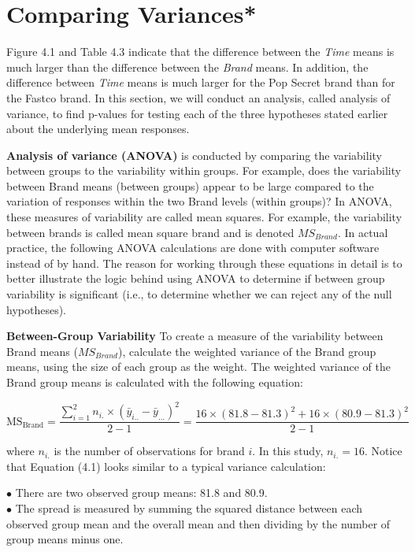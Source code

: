 \documentclass[
]{report}
\theoremstyle{definition}
\theoremstyle{definition}
\theoremstyle{definition}
\theoremstyle{definition}
\theoremstyle{remark}
\begin{document}
\hypertarget{comparing-variances}{%
\section{Comparing Variances*}\label{comparing-variances}}

Figure 4.1 and Table 4.3 indicate that the difference between the \emph{Time} means is much larger than the difference between the \emph{Brand} means. In addition, the difference between \emph{Time} means is much larger for the Pop Secret brand than for the Fastco brand. In this section, we will conduct an analysis, called analysis of variance, to find p-values for testing each of the three hypotheses stated earlier about the underlying mean responses.

\textbf{Analysis of variance (ANOVA)} is conducted by comparing the variability between groups to the variability within groups. For example, does the variability between Brand means (between groups) appear to be large compared to the variation of responses within the two Brand levels (within groups)? In ANOVA, these measures of variability are called mean squares. For example, the variability between brands is called mean square brand and is denoted \(MS_{Brand}\). In actual practice, the following ANOVA calculations are done
with computer software instead of by hand. The reason for working through these equations in detail is to
better illustrate the logic behind using ANOVA to determine if between group variability is significant (i.e.,
to determine whether we can reject any of the null hypotheses).

\textbf{Between-Group Variability} To create a measure of the variability between Brand means (\(MS_{Brand}\)), calculate the weighted variance of the Brand group means, using the size of each group as the weight. The weighted variance of the Brand group means is calculated with the following equation:

\begin{equation}
\mathrm{MS}_{\mathrm{Brand}}
= \frac{\sum_{i=1}^2 n_{i.} \times (\bar y_{i..} - \bar y_{...})^2}{2 - 1}
= \frac{16\times(81.8 - 81.3)^2 + 16\times(80.9 - 81.3)^2}{2 - 1}
\tag{4.1}
\end{equation}

where \(n_{i.}\) is the number of observations for brand \(i\). In this study, \(n_{i.} = 16\). Notice that Equation (4.1) looks similar to a typical variance calculation:

\(\bullet\) There are two observed group means: 81.8 and 80.9.\\
\(\bullet\) The spread is measured by summing the squared distance between each observed group mean and the overall mean and then dividing by the number of group means minus one.
\end{document}
